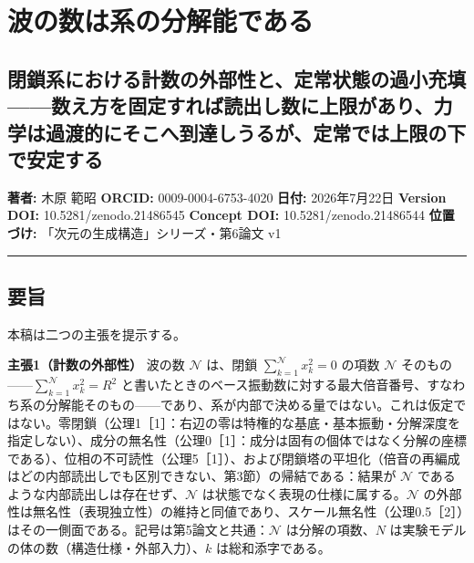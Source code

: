 \documentclass[
  a4paper,
]{ltjsarticle}
\author{}
\date{}
\begin{document}
\section{波の数は系の分解能である}\label{ux6ce2ux306eux6570ux306fux7cfbux306eux5206ux89e3ux80fdux3067ux3042ux308b}

\subsection{閉鎖系における計数の外部性と、定常状態の過小充填------数え方を固定すれば読出し数に上限があり、力学は過渡的にそこへ到達しうるが、定常では上限の下で安定する}\label{ux9589ux9396ux7cfbux306bux304aux3051ux308bux8a08ux6570ux306eux5916ux90e8ux6027ux3068ux5b9aux5e38ux72b6ux614bux306eux904eux5c0fux5145ux586bux6570ux3048ux65b9ux3092ux56faux5b9aux3059ux308cux3070ux8aadux51faux3057ux6570ux306bux4e0aux9650ux304cux3042ux308aux529bux5b66ux306fux904eux6e21ux7684ux306bux305dux3053ux3078ux5230ux9054ux3057ux3046ux308bux304cux5b9aux5e38ux3067ux306fux4e0aux9650ux306eux4e0bux3067ux5b89ux5b9aux3059ux308b}

\textbf{著者:} 木原 範昭 \textbf{ORCID:} 0009-0004-6753-4020
\textbf{日付:} 2026年7月22日 \textbf{Version DOI:}
10.5281/zenodo.21486545 \textbf{Concept DOI:} 10.5281/zenodo.21486544
\textbf{位置づけ:} 「次元の生成構造」シリーズ・第6論文 v1

\begin{center}\rule{0.5\linewidth}{0.5pt}\end{center}

\subsection{要旨}\label{ux8981ux65e8}

本稿は二つの主張を提示する。

\textbf{主張1（計数の外部性）} 波の数 \(\mathcal N\) は、閉鎖
\(\sum_{k=1}^{\mathcal N} x_k^2=0\) の項数 \(\mathcal N\)
そのもの------\(\sum_{k=1}^{\mathcal N} x_k^2=R^2\)
と書いたときのベース振動数に対する最大倍音番号、すなわち系の分解能そのもの------であり、系が内部で決める量ではない。これは仮定ではない。零閉鎖（公理1［1］：右辺の零は特権的な基底・基本振動・分解深度を指定しない）、成分の無名性（公理0［1］：成分は固有の個体ではなく分解の座標である）、位相の不可読性（公理5［1］）、および閉鎖塔の平坦化（倍音の再編成はどの内部読出しでも区別できない、第3節）の帰結である：結果が
\(\mathcal N\) であるような内部読出しは存在せず、\(\mathcal N\)
は状態でなく表現の仕様に属する。\(\mathcal N\)
の外部性は無名性（表現独立性）の維持と同値であり、スケール無名性（公理0.5［2］）はその一側面である。記号は第5論文と共通：\(\mathcal N\)
は分解の項数、\(N\) は実験モデルの体の数（構造仕様・外部入力）、\(k\)
は総和添字である。
\end{document}
